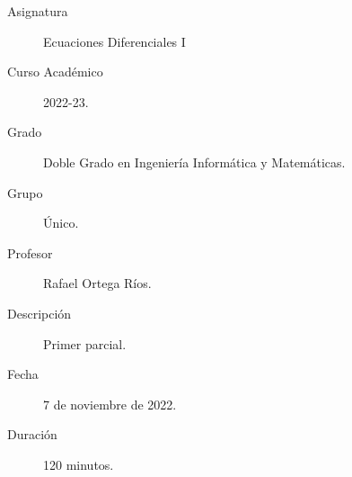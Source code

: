\documentclass[12pt]{article}
\begin{document}

    
    

    \begin{description}
        \item[Asignatura] Ecuaciones Diferenciales I
        \item[Curso Académico] 2022-23.
        \item[Grado] Doble Grado en Ingeniería Informática y Matemáticas.
        \item[Grupo] Único.
        \item[Profesor] Rafael Ortega Ríos.
        \item[Descripción] Primer parcial.
        \item[Fecha] 7 de noviembre de 2022.
        \item[Duración] 120 minutos.    
    \end{description}
    \newpage
\end{document}
